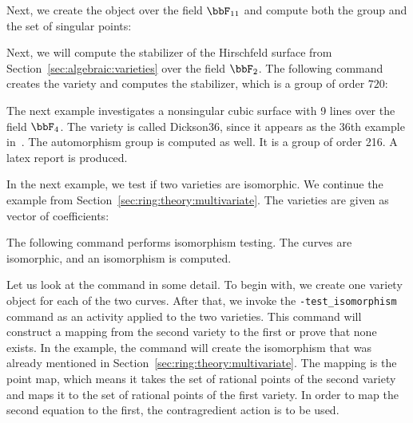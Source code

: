 

Next, we create the object over the field $\bbF_{11}$ 
and compute both the group and the set of singular points:




\bigskip



Next, we will compute the stabilizer of the Hirschfeld surface 
from Section~\ref{sec:algebraic:varieties} over the field $\bbF_2$.
The following command creates the variety and computes the stabilizer, 
which is a group of order $720$:



\bigskip


The next example investigates a nonsingular cubic surface with 9 lines over the field $\bbF_4$.
The variety is called Dickson36, since it appears as the 36th example in~\cite{Dickson15}.
The automorphism group is computed as well. It is a group of order 216.
A latex report is produced.





\bigskip



In the next example, we test if two varieties are isomorphic. 
We continue the example from Section~\ref{sec:ring:theory:multivariate}.
The varieties are given as vector of coefficients:





The following command performs isomorphism testing. 
The curves are isomorphic, and an isomorphism is computed. 


Let us look at the command in some detail.
To begin with, we create one variety object for each of the two curves.
After that, we invoke the \verb'-test_isomorphism' command as an activity applied to the two varieties. 
This command will construct a mapping from the second variety to the first 
or prove that none exists. 
In the example, the command will create the 
isomorphism 
that was already mentioned in Section~\ref{sec:ring:theory:multivariate}.
The mapping is the point map, which means it takes the set of rational points of the second variety and maps it to the set of rational points of the first variety. 
In order to map the second equation to the first, 
the contragredient action is to be used. 





